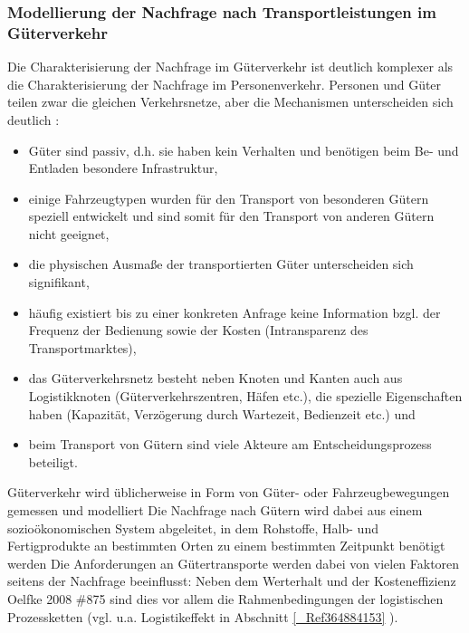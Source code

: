 % 
\subsubsection{Modellierung der Nachfrage nach Transportleistungen im Güterverkehr}
\label{_Toc363572023}
\label{_Ref363581309}
\label{_Ref364779595}
\label{_Ref365588977}
\label{_Toc366766085}
\label{_Toc366775279}
Die Charakterisierung der Nachfrage im Güterverkehr ist deutlich komplexer als die Charakterisierung der Nachfrage im Personenverkehr. Personen und Güter teilen zwar die gleichen Verkehrsnetze, aber die Mechanismen unterscheiden sich deutlich  \autocites[vgl. für folgende Aufzählung][249f.]{bib.403}: ~\\

\begin{itemize}
%
   \item Güter sind passiv, d.h. sie haben kein Verhalten und benötigen beim Be- und Entladen besondere Infrastruktur,
   \item einige Fahrzeugtypen wurden für den Transport von besonderen Gütern speziell entwickelt und sind somit für den Transport von anderen Gütern nicht geeignet,
   \item die physischen Ausmaße der transportierten Güter unterscheiden sich signifikant,
   \item häufig existiert bis zu einer konkreten Anfrage keine Information bzgl. der Frequenz der Bedienung sowie der Kosten (Intransparenz des Transportmarktes),
   \item das Güterverkehrsnetz besteht neben Knoten und Kanten auch aus Logistikknoten (Güterverkehrszentren, Häfen etc.), die spezielle Eigenschaften haben (Kapazität, Verzögerung durch Wartezeit, Bedienzeit etc.) und 
   \item beim Transport von Gütern sind viele Akteure am Entscheidungsprozess beteiligt.
%
\end{itemize}
Güterverkehr wird üblicherweise in Form von Güter- oder Fahrzeugbewegungen gemessen und modelliert  \autocites[][]{bib.682} Die Nachfrage nach Gütern wird dabei aus einem sozioökonomischen System abgeleitet, in dem Rohstoffe, Halb- und Fertigprodukte an bestimmten Orten zu einem bestimmten Zeitpunkt benötigt werden  \autocites[][]{bib.942} Die Anforderungen an Gütertransporte werden dabei von vielen Faktoren seitens der Nachfrage beeinflusst: Neben dem Werterhalt und der Kosteneffizienz {Oelfke 2008 \#875} sind dies vor allem die Rahmenbedingungen der logistischen Prozessketten (vgl. u.a. Logistikeffekt in Abschnitt \autoref{_Ref364884153} ).~\\


